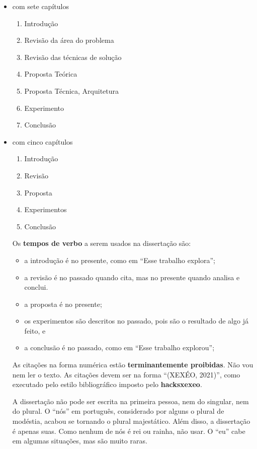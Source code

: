 \documentclass{article}
\begin{document}
\begin{itemize}
    \item com sete capítulos
    \begin{enumerate}
        \item Introdução
        \item Revisão da área do problema
        \item Revisão das técnicas de solução
        \item Proposta Teórica
        \item Proposta Técnica, Arquitetura
        \item Experimento 
        \item Conclusão
    \end{enumerate}
    \item com cinco capítulos
    \begin{enumerate}
        \item Introdução
        \item Revisão
        \item Proposta
        \item Experimentos
        \item Conclusão
    \end{enumerate}



Os \textbf{tempos de verbo} a serem usados na dissertação são:
\begin{itemize}
    \item a introdução é no presente, como em ``Esse trabalho explora'';
    \item a revisão é no passado quando cita, mas no presente quando analisa e conclui.
    \item a proposta é no presente;
    \item os experimentos são descritos no passado, pois são o resultado de algo já feito, e
    \item a conclusão é no passado, como em ``Esse trabalho explorou'';
\end{itemize}

As citações na forma numérica estão \textbf{terminantemente proibidas}. Não vou nem ler o texto. As citações devem ser na forma ``(XEXÉO, 2021)'', como executado pelo estilo bibliográfico imposto pelo \textbf{hacksxexeo}.

A dissertação não pode ser escrita na primeira pessoa, nem do singular, nem do plural. O ``nós'' em português, considerado por alguns o plural de modéstia, acabou se tornando o plural majestático. Além disso, a dissertação é apenas suas. Como nenhum de nós é rei ou rainha, não usar. O ``eu'' cabe em algumas situações, mas são muito raras. 


\end{itemize}
\end{document}
